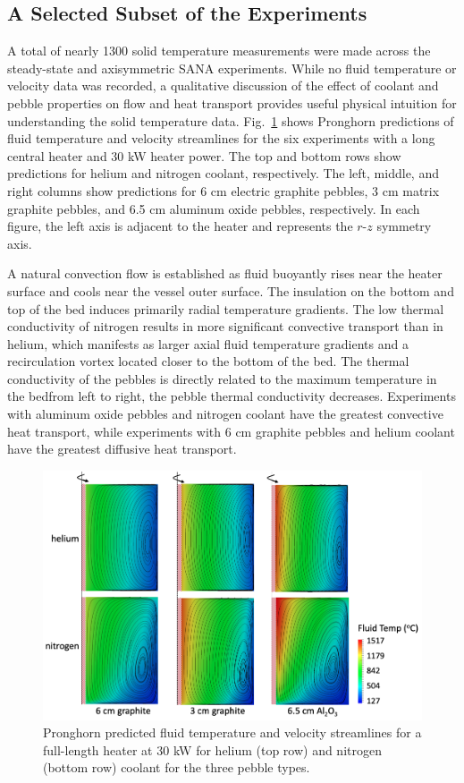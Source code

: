 \subsection{A Selected Subset of the Experiments}
\label{sec:sana_subset}

A total of nearly 1300 solid temperature measurements were made across the steady-state and axisymmetric SANA experiments. While no fluid temperature or velocity data was recorded, a qualitative discussion of the effect of coolant and pebble properties on flow and heat transport provides useful physical intuition for understanding the solid temperature data. Fig.\ \ref{fig:streamlines2} shows Pronghorn predictions of fluid temperature and velocity streamlines for the six experiments with a long central heater and 30 \si{\kilo\watt} heater power. The top and bottom rows show predictions for helium and nitrogen coolant, respectively. The left, middle, and right columns show predictions for 6 \si{\centi\meter} electric graphite pebbles, 3 \si{\centi\meter} matrix graphite pebbles, and 6.5 \si{\centi\meter} aluminum oxide pebbles, respectively. In each figure, the left axis is adjacent to the heater and represents the $r$-$z$ symmetry axis. 

A natural convection flow is established as fluid buoyantly rises near the heater surface and cools near the vessel outer surface. The insulation on the bottom and top of the bed induces primarily radial temperature gradients. The low thermal conductivity of nitrogen results in more significant convective transport than in helium, which manifests as larger axial fluid temperature gradients and a recirculation vortex located closer to the bottom of the bed. The thermal conductivity of the pebbles is directly related to the maximum temperature in the bed\mdash from left to right, the pebble thermal conductivity decreases. Experiments with aluminum oxide pebbles and nitrogen coolant have the greatest convective heat transport, while experiments with 6 \si{\centi\meter} graphite pebbles and helium coolant have the greatest diffusive heat transport. 

\begin{figure}[h!]
\centering
\centerline{
\includegraphics[height=0.55\linewidth]{figs/sana_30kW_vel.png}}
\caption{Pronghorn predicted fluid temperature and velocity streamlines for a full-length heater at 30 \si{\kilo\watt} for helium (top row) and nitrogen (bottom row) coolant for the three pebble types.}
\label{fig:streamlines2}
\end{figure}

